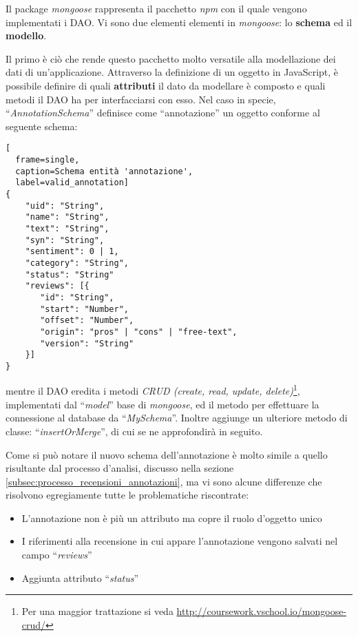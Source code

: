 Il package \textit{mongoose} rappresenta il pacchetto \textit{npm} con il quale
vengono implementati i \gls{DAO}. Vi sono due elementi elementi in
\textit{mongoose}: lo \textbf{schema} ed il \textbf{modello}.

Il primo è ciò che rende questo pacchetto molto versatile alla modellazione dei
dati di un'applicazione. Attraverso la definizione di un oggetto in JavaScript,
è possibile definire di quali \textbf{attributi} il dato da modellare è composto
e quali metodi il \gls{DAO} ha per interfacciarsi con esso. Nel caso in specie,
``\textit{AnnotationSchema}'' definisce come ``annotazione'' un oggetto conforme
al seguente schema:
\begin{center}
\begin{lstlisting}[
  frame=single,
  caption=Schema entità 'annotazione',
  label=valid_annotation]
{
    "uid": "String",
    "name": "String",
    "text": "String",
    "syn": "String",
    "sentiment": 0 | 1,
    "category": "String",
    "status": "String"
    "reviews": [{
       "id": "String",
       "start": "Number",
       "offset": "Number",
       "origin": "pros" | "cons" | "free-text",
       "version": "String"
    }]
}
\end{lstlisting}
\end{center}

mentre il \gls{DAO} eredita i metodi \textit{CRUD (create, read, update,
delete)}\footnote{Per una maggior trattazione si veda
\url{http://coursework.vschool.io/mongoose-crud/}}, implementati dal
``\textit{model}'' base di \textit{mongoose}, ed il metodo per effettuare la
connessione al database da ``\textit{MySchema}''. Inoltre aggiunge un
ulteriore metodo di classe: ``\textit{insertOrMerge}'', di cui se ne
approfondirà in seguito.

Come si può notare il nuovo schema dell'annotazione è molto simile a quello
risultante dal processo d'analisi, discusso nella sezione
\ref{subsec:processo_recensioni_annotazioni}, ma vi sono alcune differenze che
risolvono egregiamente tutte le problematiche riscontrate:
\begin{itemize}
\item L'annotazione non è più un attributo ma copre il ruolo d'oggetto unico
\item I riferimenti alla recensione in cui appare l'annotazione vengono salvati
nel campo ``\textit{reviews}''
\item Aggiunta attributo ``\textit{status}''
\end{itemize}


